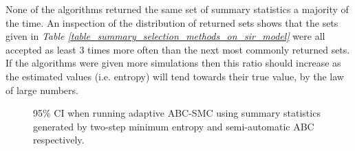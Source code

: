 \documentclass[11pt,a4paper]{article}
\theoremstyle{break}
\begin{document}
  \par None of the algorithms returned the same set of summary statistics a majority of the time. An inspection of the distribution of returned sets shows that the sets given in \textit{Table \ref{table_summary_selection_methods_on_sir_model}} were all accepted as least 3 times more often than the next most commonly returned sets. If the algorithms were given more simulations then this ratio should increase as the estimated values (i.e. entropy) will tend towards their true value, by the law of large numbers.

  \begin{figure}[H]
    \centering
    \caption{95\% CI when running adaptive ABC-SMC using summary statistics generated by two-step minimum entropy and semi-automatic ABC respectively.}
    \label{fig_compare_summary_statistic_selections}
  \end{figure}
\end{document}
